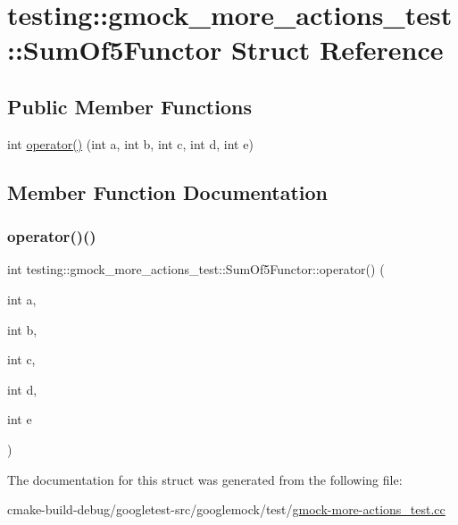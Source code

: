 \hypertarget{structtesting_1_1gmock__more__actions__test_1_1SumOf5Functor}{}\section{testing\+::gmock\+\_\+more\+\_\+actions\+\_\+test\+::Sum\+Of5\+Functor Struct Reference}
\label{structtesting_1_1gmock__more__actions__test_1_1SumOf5Functor}
\subsection*{Public Member Functions}
\begin{DoxyCompactItemize}
\item 
int \mbox{\hyperlink{structtesting_1_1gmock__more__actions__test_1_1SumOf5Functor_ab7c80522ca7401c89e86eecb03fe1fbb}{operator()}} (int a, int b, int c, int d, int e)
\end{DoxyCompactItemize}


\subsection{Member Function Documentation}
\mbox{\label{structtesting_1_1gmock__more__actions__test_1_1SumOf5Functor_ab7c80522ca7401c89e86eecb03fe1fbb}} 
\subsubsection{\texorpdfstring{operator()()}{operator()()}}
{\footnotesize\ttfamily int testing\+::gmock\+\_\+more\+\_\+actions\+\_\+test\+::\+Sum\+Of5\+Functor\+::operator() (\begin{DoxyParamCaption}\item[{int}]{a,  }\item[{int}]{b,  }\item[{int}]{c,  }\item[{int}]{d,  }\item[{int}]{e }\end{DoxyParamCaption})\hspace{0.3cm}{\ttfamily [inline]}}



The documentation for this struct was generated from the following file\+:\begin{DoxyCompactItemize}
\item 
cmake-\/build-\/debug/googletest-\/src/googlemock/test/\mbox{\hyperlink{gmock-more-actions__test_8cc}{gmock-\/more-\/actions\+\_\+test.\+cc}}\end{DoxyCompactItemize}
